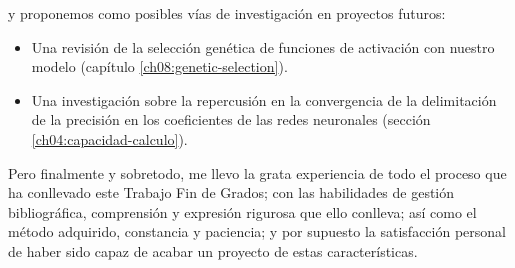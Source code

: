 y proponemos como posibles vías de investigación en proyectos futuros: 

\begin{itemize}
    \item Una revisión de la selección genética de funciones de activación con nuestro modelo (capítulo \ref{ch08:genetic-selection}).
    \item Una investigación sobre la repercusión en la convergencia de la delimitación de la precisión en los coeficientes de las redes neuronales (sección \ref{ch04:capacidad-calculo}). 
\end{itemize}

Pero finalmente y sobretodo, me llevo la grata experiencia de 
todo el proceso que ha conllevado este Trabajo Fin de Grados;
con las habilidades de gestión bibliográfica, comprensión y expresión rigurosa que ello conlleva;
así como el método adquirido, constancia y paciencia;
y por supuesto la satisfacción personal de haber sido capaz de acabar un proyecto 
de estas características. 


